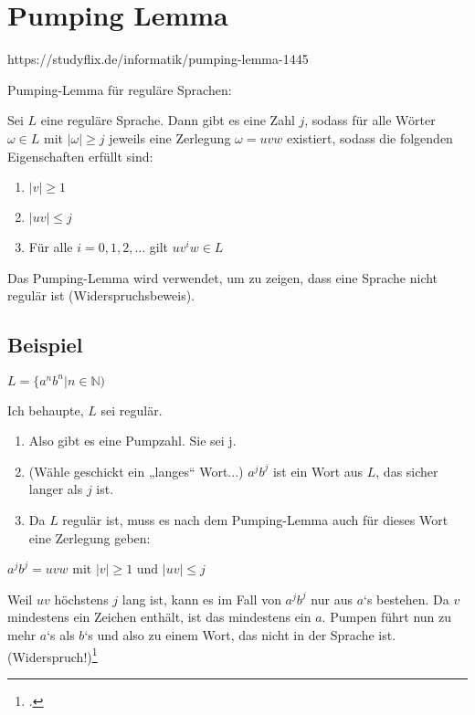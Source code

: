 \documentclass{lehramt-informatik-haupt}
\begin{document}
%

\section{Pumping Lemma}

https://studyflix.de/informatik/pumping-lemma-1445

Pumping-Lemma für reguläre Sprachen:

Sei $L$ eine reguläre Sprache. Dann gibt es eine Zahl $j$, sodass für
alle Wörter $ω ∈ L$ mit $|\omega| \geq j$ jeweils eine Zerlegung $\omega
= uvw$ existiert, sodass die folgenden Eigenschaften erfüllt sind:

\begin{enumerate}
\item $|v| \geq 1$
\item $|uv| \leq j$
\item Für alle $i = 0, 1, 2, \dots$ gilt $uv^iw \in L$
\end{enumerate}

Das Pumping-Lemma wird verwendet, um zu zeigen, dass eine
Sprache nicht regulär ist (Widerspruchsbeweis).

%

\subsection{Beispiel}

$L = \{a^n b^n | n \in \mathbb{N})$

Ich behaupte, $L$ sei regulär.

\begin{enumerate}
\item Also gibt es eine Pumpzahl. Sie sei j.
\item (Wähle geschickt ein „langes“ Wort...)
$a^j b^j$ ist ein Wort aus $L$, das sicher langer als $j$ ist.
\item Da $L$ regulär ist, muss es nach dem Pumping-Lemma auch für dieses
Wort eine Zerlegung geben:
\end{enumerate}

$a^j b^j = uvw$ mit $|v| \geq 1$ und $|uv| \leq j$

Weil $uv$ höchstens $j$ lang ist, kann es im Fall von $a^j b^j$ nur aus
$a$‘s bestehen. Da $v$ mindestens ein Zeichen enthält, ist das
mindestens ein $a$. Pumpen führt nun zu mehr $a$‘s als $b$‘s und also zu
einem Wort, das nicht in der Sprache ist. (Widerspruch!)\footcite{wiki:pumping}
\end{document}
